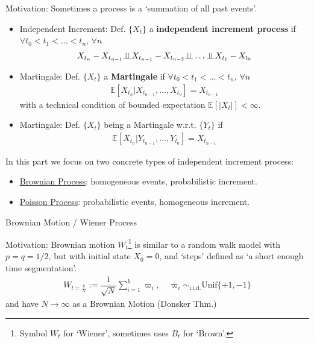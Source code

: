 Motivation: Sometimes a process is a `summation of all past events'.

\begin{itemize}[topsep=2pt,itemsep=0pt]
    \item Independent Increment: Def. $ \{X_t\} $ a \textbf{independent increment process} if $ \forall t_0<t_1<\ldots<t_n $, $ \forall n $
\begin{align*}
    X_{t_{n}}-X_{t_{n-1}}\independent X_{t_{n-1}}-X_{t_{n-2}} \independent \ldots\independent X_{t_1}-X_{t_0}
\end{align*}
    \item Martingale: Def. $ \{X_t\}  $ a \textbf{Martingale} if $ \forall t_0<t_1<\ldots<t_n $, $ \forall n $
    \begin{align*}
        \mathbb{E}\left[ X_{t_n}|X_{t_{n-1}},\ldots,X_{t_0} \right] = X_{t_{n-1}} 
    \end{align*}
    with a technical condition of bounded expectation $ \mathbb{E}\left[ |X_t| \right] <\infty $.
    \item Martingale: Def. $ \{X_t\}  $ being a Martingale w.r.t. $ \{Y_t\} $ if
    \begin{align*}
        \mathbb{E}\left[ X_{t_n}|Y_{t_{n-1}},\ldots,Y_{t_0} \right] = X_{t_{n-1}} 
    \end{align*}
\end{itemize}

In this part we focus on two concrete types of independent increment process:
\begin{itemize}[topsep=2pt,itemsep=0pt]
    \item \hyperlink{BrownianProcess}{Brownian Process}: homogeneous events, probabilistic increment.
    \item \hyperlink{PoissonProcess}{Poisson Process}: probabilistic events, homogeneous increment.
\end{itemize}

\begin{point}
    Brownian Motion / Wiener Process \hypertarget{BrownianProcess}{}
\end{point}

Motivation: Brownian motion $ W_t $\footnote{Symbol $ W_t $ for `Wiener', sometimes uses $ B_t $ for `Brown'.} is similar to a random walk model with $ p=q=1/2 $, but with initial state $ X_0=0 $, and `steps' defined as `a short enough time segmentation'.
\begin{align*}
    W_{t=\frac{k}{N}}:= \dfrac{1}{\sqrt{N}} \sum_{i=1}^k \varpi _i,\quad \varpi _i\sim_{\mathrm{i.i.d.} } \mathrm{Unif}\{+1,-1\} 
\end{align*}
and have $ N\to \infty $ as a Brownian Motion (Donsker Thm.)

